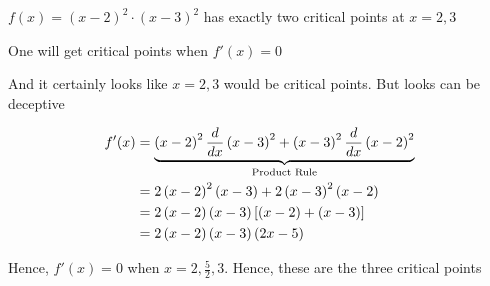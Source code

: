 \documentclass[14pt,fleqn]{extarticle}
\newcommand\ea{\left(x-2 \right)}
\newcommand\eb{ \left(x-3 \right)}
\begin{document}
 
\begin{snippet}
    
    \incorrect

     $f(x) = \ea^2\cdot\eb^2$ has exactly two critical points at $x=2,3$     
    
    \reason
    
    One will get critical points when $f'(x) = 0$ \newline 
    
    And it certainly looks like $x=2,3$ would be critical points. But looks can be deceptive 
    
    \begin{align}
	f'(x) &= \underbrace{\ea^2\ddx \eb^2  + \eb^2\ddx \ea^2}_{\text{Product Rule}} \\
	&= 2\ea^2\eb + 2\eb^2\ea\\
	&= 2\ea\eb \left[\ea + \eb \right]\\
	&= 2\ea\eb \left(2x-5 \right)
\end{align}

Hence, $f'(x) = 0$ when $x=2, \frac{5}{2}, 3$. Hence, these are the 
three critical points 
    
\end{snippet} 
\end{document}
